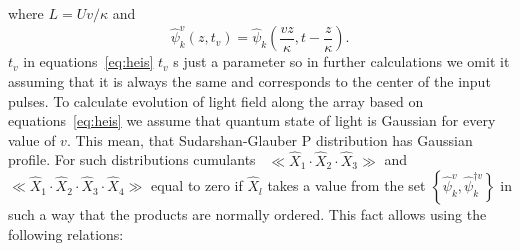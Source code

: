 \documentclass{osa-article}
\begin{document}
where $L=Uv/\kappa$ and
\begin{equation}
	\hat{\psi}^{v}_k\!\left(z,\!t_v\!\right) = \hat{\psi}^{\phantom{\dag}}_k\!\left(\dfrac{vz}{\kappa},\!t - \dfrac{z}{\kappa}\!\right).
\end{equation}
$t_v$ in equations~\eqref{eq:heis} $t_v$ s just a parameter so in further calculations we omit it assuming that it is always the same and corresponds to the center of the input pulses. 
To calculate evolution of light field along the array based on equations~\eqref{eq:heis} we assume that quantum state of light is Gaussian for every value of $v$. 
This mean, that Sudarshan-Glauber P distribution has Gaussian profile. 
For such distributions cumulants~\cite{gardiner_stochastic_2009} $\ll\hat{X}_1\cdot\hat{X}_2\cdot\hat{X}_3\gg$ and $\ll\hat{X}_1\cdot\hat{X}_2\cdot\hat{X}_3\cdot\hat{X}_4\gg$ equal to zero if $\hat{X}_l$ takes a value from the set $\left\{\hat{\psi}^{v}_{k}, \hat{\psi}^{\dag v}_{k} \right\}$ in such a way that the products are normally ordered. This fact allows using the following relations:
\end{document}
